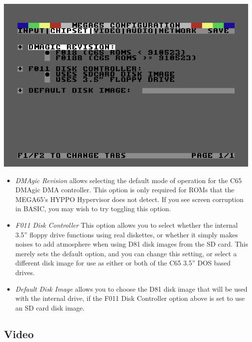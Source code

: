 \includegraphics[width=\linewidth]{images/ss-m65config-2.png}

\begin{itemize}
  \item{\em DMAgic Revision} allows selecting the default mode of
    operation for the C65 DMAgic DMA controller.  This option is only
    required for ROMs that the MEGA65's HYPPO Hypervisor does not
    detect.  If you see screen corruption in BASIC, you may wish to
    try toggling this option.
  \item{\em F011 Disk Controller}
    This option allows you to select whether the internal 3.5'' floppy
    drive functions using real diskettes, or whether it simply makes
    noises to add atmosphere when using D81 disk images from the SD
    card.  This merely sets the default option, and you can change
    this setting, or select a different disk image for use as either
    or both of the C65 3.5'' DOS based drives.
  \item{\em Default Disk Image} allows you to choose the D81 disk image
    that will be used with the internal drive, if the F011 Disk
    Controller option above is set to use an SD card disk image.    
\end{itemize}

\subsection{Video}


